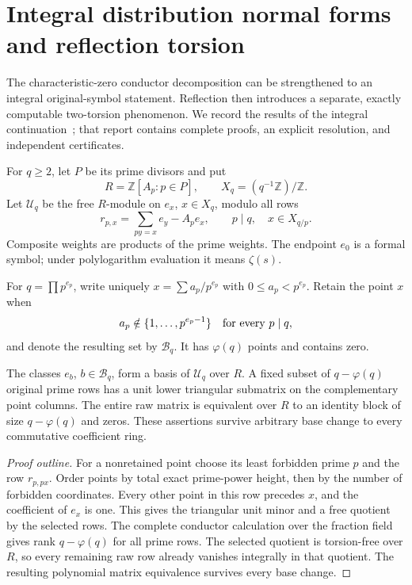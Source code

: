 \section{Integral distribution normal forms and reflection torsion}
\label{intdist:sec:integral}
The characteristic-zero conductor decomposition can be strengthened to an
integral original-symbol statement. Reflection then introduces a separate,
exactly computable two-torsion phenomenon. We record the results of the
integral continuation~\cite{IntegralDistributionReflection2026}; that report
contains complete proofs, an explicit resolution, and independent certificates.

For $q\ge2$, let $P$ be its prime divisors and put
\[
 R=\mathbb Z[A_p:p\in P],\qquad X_q=(q^{-1}\mathbb Z)/\mathbb Z.
\]
Let $\mathcal U_q$ be the free $R$-module on $e_x$, $x\in X_q$, modulo
all rows
\[
 r_{p,x}=\sum_{py=x}e_y-A_pe_x,\qquad p\mid q,\quad x\in X_{q/p}.
\]
Composite weights are products of the prime weights. The endpoint $e_0$
is a formal symbol; under polylogarithm evaluation it means $\zeta(s)$.

For $q=\prod p^{e_p}$, write uniquely
$x=\sum a_p/p^{e_p}$ with $0\le a_p<p^{e_p}$. Retain the point $x$ when
\[
 a_p\notin\{1,\ldots,p^{e_p-1}\}\quad\hbox{for every }p\mid q,
\]
and denote the resulting set by $\mathcal B_q$. It has $\varphi(q)$
points and contains zero.

\begin{theorem}
\label{intdist:thm:unit}
The classes $e_b$, $b\in\mathcal B_q$, form a basis of $\mathcal U_q$
over $R$. A fixed subset of $q-\varphi(q)$ original prime rows has a
unit lower triangular submatrix on the complementary point columns.
The entire raw matrix is equivalent over $R$ to an identity block of
size $q-\varphi(q)$ and zeros. These assertions survive arbitrary base
change to every commutative coefficient ring.
\end{theorem}
\begin{proof}[Proof outline]
For a nonretained point choose its least forbidden prime $p$ and the row
$r_{p,px}$. Order points by total exact prime-power height, then by the
number of forbidden coordinates. Every other point in this row precedes
$x$, and the coefficient of $e_x$ is one. This gives the triangular unit
minor and a free quotient by the selected rows. The complete conductor
calculation over the fraction field gives rank $q-\varphi(q)$ for all
prime rows. The selected quotient is torsion-free over $R$, so every
remaining raw row already vanishes integrally in that quotient. The
resulting polynomial matrix equivalence survives every base change.
\end{proof}

